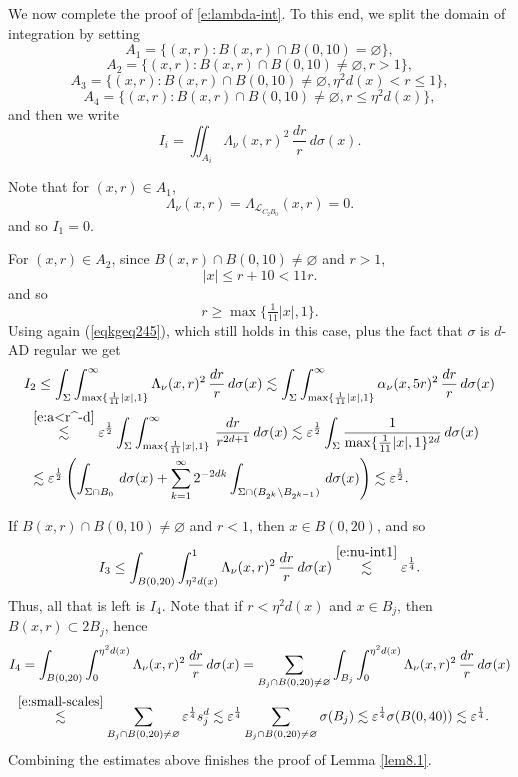 \documentclass[11pt]{amsart}
\newcommand{\LL}{{\mathcal L}}
\newcommand{\rf}[1]{{(\ref{#1})}}
\newcommand{\ve}{{\varepsilon}}
\theoremstyle{definition}
\theoremstyle{remark}
\numberwithin{equation}{section}
\def\lec{\lesssim}
\def\lec{\lesssim}
\begin{document}
We now complete the proof of \eqref{e:lambda-int}. To this end, we split the domain of integration by setting
\[
A_{1} = \{(x,r): B(x,r)\cap B(0,10)=\varnothing\},
\]	
\[
A_{2}=\{(x,r): B(x,r)\cap B(0,10)\neq\varnothing, r>1\},
\]
\[
A_{3} = \{(x,r): B(x,r)\cap B(0,10)\neq\varnothing,\eta^2 d(x)<r\leq 1\},
\]
\[
A_{4} = \{(x,r): B(x,r)\cap B(0,10)\neq\varnothing, r\leq \eta^2 d(x) \},
\]
and then we write 
\[
I_{i}=\iint_{A_{i}} \Lambda_{\nu}(x,r)^{2}\, \frac{dr}{r} \,d\sigma(x) .
\]

Note that for $(x,r)\in A_{1}$,
\[
\Lambda_{\nu}(x,r) = \Lambda_{\LL_{C_{2} B_{0}}} (x,r)=0.
\]
and so
$
I_{1}=0.
$

For $(x,r)\in A_{2}$, since $B(x,r)\cap B(0,10)\neq\varnothing$ and $r>1$, 
\[
|x| \leq r +10<11r.
\]
and so 
\[ r\geq \max\{\tfrac1{11}|x|,1\}.\]
Using again \rf{eqkgeq245}, which still holds in this case, plus the fact that $\sigma$ is $d$-AD regular 
 we get
\begin{align*}
I_{2} 
& \leq \int_{\Sigma} \int_{\max\{\frac1{11}|x|,1\}}^{\infty} \Lambda_{\nu}(x,r)^{2} \,\frac{dr}{r}\,d\sigma(x) 
\lec \int_{\Sigma}\int_{\max\{\frac1{11}|x|,1\}}^{\infty} \alpha_{\nu}(x,5r)^{2} \,\frac{dr}{r}\,d\sigma(x) \\
&\!\!\!  \stackrel{\eqref{e:a<r^-d}}{\lec}  \ve^{\frac12} \int_{\Sigma}\int_{\max\{\frac1{11}|x|,1\}}^{\infty}\, \frac{dr}{r^{2d+1}}\,d\sigma(x)
\lec  \ve^{\frac12} \int_{\Sigma} \frac{1}{\max\{\frac1{11}|x|,1\}^{2d}}\,d\sigma(x)\\
&\!\!\! \lec\ve^{\frac12} \left(\int_{\Sigma\cap B_0} \,d\sigma(x)+ \sum_{k=1}^\infty2^{-2dk}\int_{\Sigma\cap (B_{2^k}\backslash B_{2^{k-1}})}\,d\sigma(x)\right)
\lec \ve^{\frac12}. 
\end{align*}
 
If $B(x,r)\cap B(0,10)\neq\varnothing$ and $r<1$, then $x\in B(0,20)$, and so
\[
I_{3} 
\leq \int_{B(0,20)}\int_{\eta^2 d(x)}^{1}  \Lambda_{\nu}(x,r)^{2} \,\frac{dr}{r} \,d\sigma(x) 
\stackrel{\eqref{e:nu-int1}}{\lec} \ve^{\frac{1}{4}}. 
\]
Thus, all that is left is $I_{4}$. Note that if $r<\eta^2 d(x)$ and $x\in B_{j}$, then $B(x,r)\subset 2B_{j}$, hence
\begin{align*}
I_{4} 
& =  \int_{B(0,20)}\int_{0}^{\eta^2 d(x)} \Lambda_{\nu}(x,r)^{2} \,\frac{dr}{r}\, d\sigma(x) 
 =\sum_{B_{j}\cap B(0,20)\neq\varnothing} \int_{B_{j}}\int_{0}^{\eta^2 d(x)} \Lambda_{\nu}(x,r)^{2} \,\frac{dr}{r}\, d\sigma(x)\\
 & \!\!\!\stackrel{\eqref{e:small-scales}}{\lec} \sum_{B_{j}\cap B(0,20)\neq\varnothing}  \ve^{\frac14} s_{j}^{d}
 \lec \ve^{\frac14}\sum_{B_{j}\cap B(0,20)\neq\varnothing}\sigma(B_{j})
 \lec \ve^{\frac14} \sigma(B(0,40)) \lec \ve^{\frac14}. 
\end{align*}
Combining the estimates above finishes the proof of Lemma \ref{lem8.1}.
\end{document}

